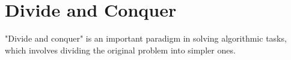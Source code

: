 \section{Divide and Conquer}
\label{addDivideAndConquer}
"Divide and conquer" is an important paradigm in solving algorithmic tasks, which involves dividing the original problem into simpler ones.
